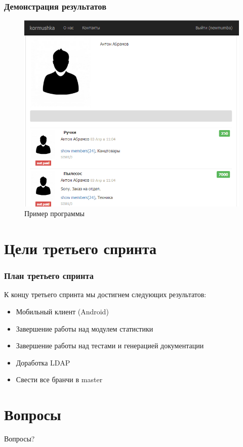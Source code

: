 \documentclass{beamer}
\newlength{\wideitemsep}
\let\olditem\item
\renewcommand{\item}{\setlength{\itemsep}{\wideitemsep}\olditem}
\begin{document}
\begin{frame}
\frametitle{Демонстрация результатов}

\begin{figure}[h!]
\includegraphics[scale=0.40]{res/r2_result}
\caption{Пример программы}
\end{figure}

\end{frame}

\section{Цели третьего спринта}

\begin{frame}
\frametitle{План третьего спринта}

К концу третьего спринта мы достигнем следующих результатов:
\medskip
\begin{itemize}
\item Мобильный клиент (Android)
\item Завершение работы над модулем статистики
\item Завершение работы над тестами и генерацией документации
\item Доработка LDAP
\item Свести все бранчи в master
\end{itemize}

\end{frame}

\section{Вопросы}

\begin{frame}
\Huge{\centerline{Вопросы?}}
\end{frame}

\end{document}
